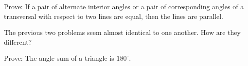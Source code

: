 \documentclass{ximera}
\begin{document}
\begin{problem}
Prove: If a pair of alternate interior angles or a pair of corresponding angles of a transversal with respect to two lines are equal, then the lines are parallel.
\end{problem}

\begin{problem}
The previous two problems seem almost identical to one another.  How are they different?  
\end{problem}

\begin{problem}
Prove:  The angle sum of a triangle is $180^\circ$.
\end{problem}
\end{document}

